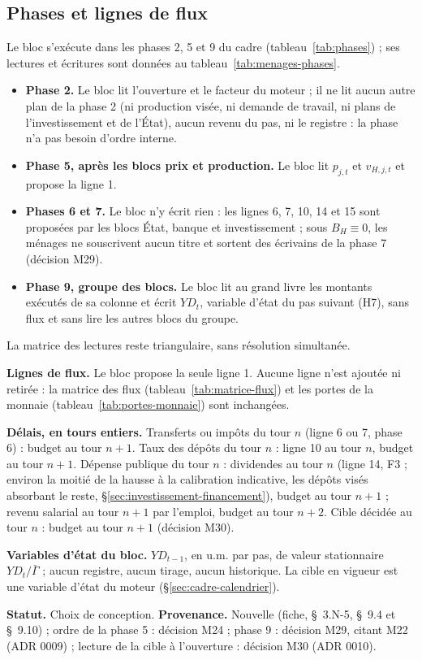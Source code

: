 \documentclass[11pt,a4paper]{article}
\begin{document}
\subsection{Phases et lignes de flux}
\label{sec:menages-phases}
\begin{proposee}
Le bloc s'exécute dans les phases 2, 5 et 9 du cadre (tableau~\ref{tab:phases}) ; ses lectures et écritures sont données au tableau~\ref{tab:menages-phases}.
\begin{itemize}
\item \textbf{Phase 2.} Le bloc lit l'ouverture et le facteur du moteur ; il ne lit aucun autre plan de la phase 2 (ni production visée, ni demande de travail, ni plans de l'investissement et de l'État), aucun revenu du pas, ni le registre : la phase n'a pas besoin d'ordre interne.
\item \textbf{Phase 5, après les blocs prix et production.} Le bloc lit $p_{j,t}$ et $v_{H,j,t}$ et propose la ligne 1.
\item \textbf{Phases 6 et 7.} Le bloc n'y écrit rien : les lignes 6, 7, 10, 14 et 15 sont proposées par les blocs État, banque et investissement ; sous $B_H \equiv 0$, les ménages ne souscrivent aucun titre et sortent des écrivains de la phase 7 (décision M29).
\item \textbf{Phase 9, groupe des blocs.} Le bloc lit au grand livre les montants exécutés de sa colonne et écrit $\mathit{YD}_t$, variable d'état du pas suivant (H7), sans flux et sans lire les autres blocs du groupe.
\end{itemize}
La matrice des lectures reste triangulaire, sans résolution simultanée.

\textbf{Lignes de flux.} Le bloc propose la seule ligne 1. Aucune ligne n'est ajoutée ni retirée : la matrice des flux (tableau~\ref{tab:matrice-flux}) et les portes de la monnaie (tableau~\ref{tab:portes-monnaie}) sont inchangées.

\textbf{Délais, en tours entiers.} Transferts ou impôts du tour $n$ (ligne 6 ou 7, phase 6) : budget au tour $n + 1$. Taux des dépôts du tour $n$ : ligne 10 au tour $n$, budget au tour $n + 1$. Dépense publique du tour $n$ : dividendes au tour $n$ (ligne 14, F3 ; environ la moitié de la hausse à la calibration indicative, les dépôts visés absorbant le reste, \S\ref{sec:investissement-financement}), budget au tour $n + 1$ ; revenu salarial au tour $n + 1$ par l'emploi, budget au tour $n + 2$. Cible décidée au tour $n$ : budget au tour $n + 1$ (décision M30).

\textbf{Variables d'état du bloc.} $\mathit{YD}_{t-1}$, en u.m. par pas, de valeur stationnaire $\mathit{YD}_t/\bar\Gamma$ ; aucun registre, aucun tirage, aucun historique. La cible en vigueur est une variable d'état du moteur (\S\ref{sec:cadre-calendrier}).

\textbf{Statut.} Choix de conception. \textbf{Provenance.} Nouvelle (fiche, \S~3.N-5, \S~9.4 et \S~9.10) ; ordre de la phase 5 : décision M24 ; phase 9 : décision M29, citant M22 (ADR 0009) ; lecture de la cible à l'ouverture : décision M30 (ADR 0010).
\end{proposee}
\end{document}
